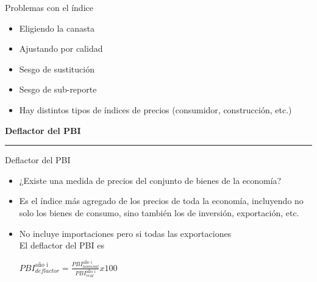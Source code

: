 \documentclass{beamer}
\begin{document}
\begin{frame}{Problemas con el índice}
    \begin{itemize}
        \item Eligiendo la canasta \vspace{1mm}
        \item Ajustando por calidad \vspace{1mm}
        \item Sesgo de sustitución \vspace{1mm}
        \item Sesgo de sub-reporte \vspace{1mm}
        \item Hay distintos tipos de índices de precios (consumidor, construcción, etc.)
    \end{itemize}
\end{frame}

\begin{frame}{}
\centering\huge\textbf{Deflactor del PBI} 
\vspace{2mm}
\hrule
\end{frame}

\begin{frame}{Deflactor del PBI }
\begin{itemize}
\item ¿Existe una medida de precios del conjunto de bienes de la economía? 
\item Es el índice más agregado de los precios de toda la economía, incluyendo no solo los bienes de consumo, sino también los de inversión, exportación, etc.
\item No incluye importaciones pero si todas las exportaciones
\\ \vspace{2mm}
El deflactor del PBI es
        \begin{center}                              $PBI_{deflactor}^{\text{año i}}=\frac{PBI_{nominal}^{\text{año i}}}{PBI_{real}^{\text{año i}}} x 100$
        \end{center}
\end{itemize}
\end{frame}
\end{document}
